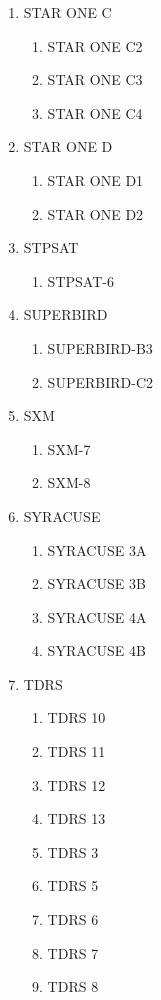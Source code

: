 \begin{multicols}{2}
\begin{enumerate}
\begin{enumerate}
    \item ST-2
  \end{enumerate}
  \item STAR ONE C
  \begin{enumerate}
    \item STAR ONE C2
    \item STAR ONE C3
    \item STAR ONE C4
  \end{enumerate}
  \item STAR ONE D
  \begin{enumerate}
    \item STAR ONE D1
    \item STAR ONE D2
  \end{enumerate}
  \item STPSAT
  \begin{enumerate}
    \item STPSAT-6
  \end{enumerate}
  \item SUPERBIRD
  \begin{enumerate}
    \item SUPERBIRD-B3
    \item SUPERBIRD-C2
  \end{enumerate}
  \item SXM
  \begin{enumerate}
    \item SXM-7
    \item SXM-8
  \end{enumerate}
  \item SYRACUSE
  \begin{enumerate}
    \item SYRACUSE 3A
    \item SYRACUSE 3B
    \item SYRACUSE 4A
    \item SYRACUSE 4B
  \end{enumerate}
  \item TDRS
  \begin{enumerate}
    \item TDRS 10
    \item TDRS 11
    \item TDRS 12
    \item TDRS 13
    \item TDRS 3
    \item TDRS 5
    \item TDRS 6
    \item TDRS 7
    \item TDRS 8

\end{enumerate}
\end{enumerate}
\end{multicols}
